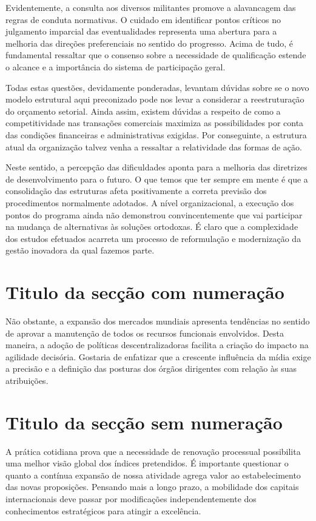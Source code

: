 \documentclass[12pt, a4paper]{article}
\begin{document}
	Evidentemente, a consulta aos diversos militantes promove a alavancagem das regras de conduta normativas. O cuidado em identificar pontos críticos no julgamento imparcial das eventualidades representa uma abertura para a melhoria das direções preferenciais no sentido do progresso. Acima de tudo, é fundamental ressaltar que o consenso sobre a necessidade de qualificação estende o alcance e a importância do sistema de participação geral.
	
	Todas estas questões, devidamente ponderadas, levantam dúvidas sobre se o novo modelo estrutural aqui preconizado pode nos levar a considerar a reestruturação do orçamento setorial. Ainda assim, existem dúvidas a respeito de como a competitividade nas transações comerciais maximiza as possibilidades por conta das condições financeiras e administrativas exigidas. Por conseguinte, a estrutura atual da organização talvez venha a ressaltar a relatividade das formas de ação.
	
	Neste sentido, a percepção das dificuldades aponta para a melhoria das diretrizes de desenvolvimento para o futuro. O que temos que ter sempre em mente é que a consolidação das estruturas afeta positivamente a correta previsão dos procedimentos normalmente adotados. A nível organizacional, a execução dos pontos do programa ainda não demonstrou convincentemente que vai participar na mudança de alternativas às soluções ortodoxas. É claro que a complexidade dos estudos efetuados acarreta um processo de reformulação e modernização da gestão inovadora da qual fazemos parte.
	
	\section{Titulo da secção com numeração}
	
	Não obstante, a expansão dos mercados mundiais apresenta tendências no sentido de aprovar a manutenção de todos os recursos funcionais envolvidos. Desta maneira, a adoção de políticas descentralizadoras facilita a criação do impacto na agilidade decisória. Gostaria de enfatizar que a crescente influência da mídia exige a precisão e a definição das posturas dos órgãos dirigentes com relação às suas atribuições.
	
	\section*{Titulo da secção sem numeração}
	
	A prática cotidiana prova que a necessidade de renovação processual possibilita uma melhor visão global dos índices pretendidos. É importante questionar o quanto a contínua expansão de nossa atividade agrega valor ao estabelecimento das novas proposições. Pensando mais a longo prazo, a mobilidade dos capitais internacionais deve passar por modificações independentemente dos conhecimentos estratégicos para atingir a excelência.
	
\end{document}
